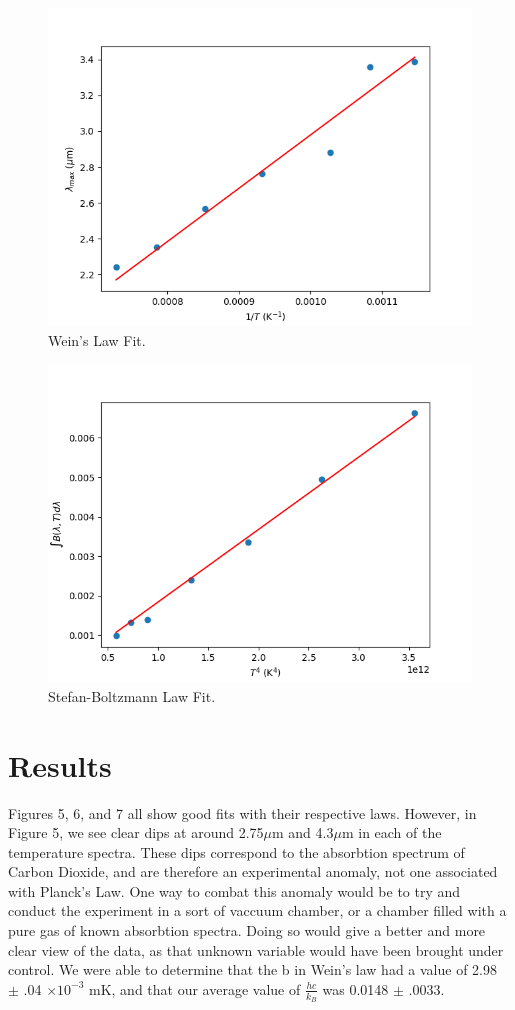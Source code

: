 \documentclass[10pt,letterpaper,onecolumn]{article}
\begin{document}
 \begin{figure}[ht]
  \begin{center}
  \includegraphics*[width=4.5in]{wienslawplot.png}
  \caption{Wein's Law Fit.\label{fig:wein} }
  \end{center}
 \end{figure}
 \begin{figure}[ht]
  \begin{center}
  \includegraphics*[width=4.5in]{stefanboltzmannplot.png}
  \caption{Stefan-Boltzmann Law Fit.\label{fig:stebo} }
  \end{center}
 \end{figure}


\section{Results}
Figures 5, 6, and 7 all show good fits with their respective laws. However,
in Figure 5, we see clear dips at around 2.75$\mu$m and 4.3$\mu$m in each 
of the temperature spectra. These dips correspond to the absorbtion spectrum
of Carbon Dioxide, and are therefore an experimental anomaly, not one associated
with Planck's Law. One way to combat this anomaly would be to try and conduct
the experiment in a sort of vaccuum chamber, or a chamber filled with a pure gas
of known absorbtion spectra. Doing so would give a better and more clear
view of the data, as that unknown variable would have been brought under control.
We were able to determine that the b in Wein's law had a value of 2.98 $\pm$ .04 $\times 10^{-3}$ mK, and
that our average value of $\frac{hc}{k_B}$ was 0.0148 $\pm$ .0033. 
\end{document}
